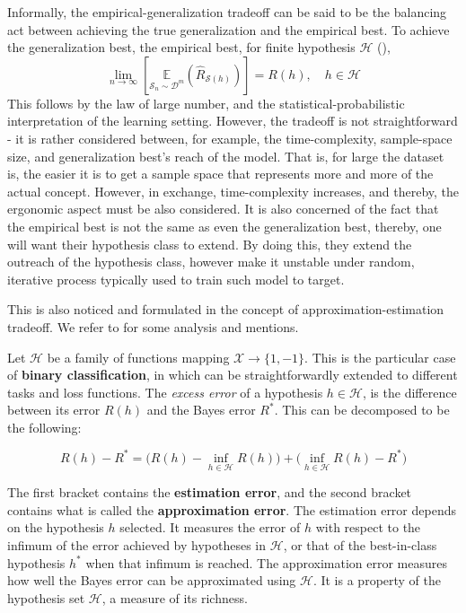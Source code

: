 \documentclass[10pt,oneside,oldfontcommands,dvipsnames,article]{memoir}
\begin{document}
Informally, the empirical-generalization tradeoff can be said to be the balancing act between achieving the true generalization and the empirical best. To achieve the generalization best, the empirical best, for finite hypothesis $\mathcal{H}$ (\cite{10.5555/2371238}), 
\begin{equation}
  \lim_{n\to \infty} \left[\underset{\mathcal{S}_{n}\sim \mathcal{D}^{m}}{\mathbb{E}}(\hat{R}_{\mathcal{S}(h)})\right]  = R(h), \quad h\in \mathcal{H}
\end{equation} 
This follows by the law of large number, and the statistical-probabilistic interpretation of the learning setting. However, the tradeoff is not straightforward - it is rather considered between, for example, the time-complexity, sample-space size, and generalization best's reach of the model. That is, for large the dataset is, the easier it is to get a sample space that represents more and more of the actual concept. However, in exchange, time-complexity increases, and thereby, the ergonomic aspect must be also considered. It is also concerned of the fact that the empirical best is not the same as even the generalization best, thereby, one will want their hypothesis class to extend. By doing this, they extend the outreach of the hypothesis class, however make it unstable under random, iterative process typically used to train such model to target. 

This is also noticed and formulated in the concept of approximation-estimation tradeoff. We refer to \cite{10.5555/2371238,lafon_understanding_2024} for some analysis and mentions. 

Let $\mathcal{H}$ be a family of functions mapping $\mathcal{X}\to\{1,-1\}$. This is the particular case of \textbf{binary classification}, in which can be straightforwardly extended to different tasks and loss functions. The \textit{excess error} of a hypothesis $h\in\mathcal{H}$, is the difference between its error $R(h)$ and the Bayes error $R^{*}$. This can be decomposed to be the following: 

\begin{equation}
    R(h) - R^{*} = \Big( R(h) - \inf_{h\in \mathcal{H}} R(h) \Big) + \Big( \inf_{h\in \mathcal{H}} R(h) - R^{*} \Big)
\end{equation}

The first bracket contains the \textbf{estimation error}, and the second bracket contains what is called the \textbf{approximation error}. The estimation error depends on the hypothesis $h$ selected. It measures the error of $h$ with respect to the infimum of the error achieved by hypotheses in $\mathcal{H}$, or that of the best-in-class hypothesis $h^{*}$ when that infimum is reached. The approximation error measures how well the Bayes error can be approximated using $\mathcal{H}$. It is a property of the hypothesis set $\mathcal{H}$, a measure of its richness. 
\end{document}
